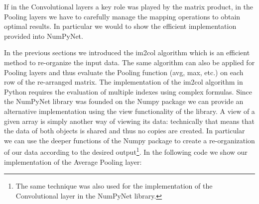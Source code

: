 \documentclass{standalone}
\begin{document}
If in the Convolutional layers a key role was played by the matrix product, in the Pooling layers we have to carefully manage the mapping operations to obtain optimal results.
In particular we would to show the efficient implementation provided into \textsf{NumPyNet}.

In the previous sections we introduced the \textsf{im2col} algorithm which is an efficient method to re-organize the input data.
The same algorithm can also be applied for Pooling layers and thus evaluate the Pooling function (avg, max, etc.) on each row of the re-arranged matrix.
The implementation of the \textsf{im2col} algorithm in Python requires the evaluation of multiple indexes using complex formulas.
Since the \textsf{NumPyNet} library was founded on the \textsf{Numpy} package we can provide an alternative implementation using the \textsf{view} functionality of the library.
A \textsf{view} of a given array is simply another way of viewing its data: technically that means that the data of both objects is shared and thus no copies are created.
In particular we can use the deeper functions of the \textsf{Numpy} package to create a re-organization of our data according to the desired output\footnote{
  The same technique was also used for the implementation of the Convolutional layer in the \textsf{NumPyNet} library.
}.
In the following code we show our implementation of the Average Pooling layer:
\end{document}
